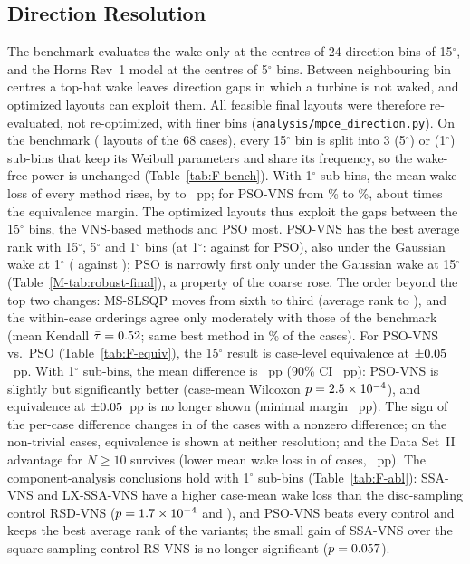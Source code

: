 \documentclass[10pt]{article}
\begin{document}
\subsection{Direction Resolution}
\label{sec:S-direction}
The benchmark evaluates the wake only at the centres of 24 direction bins of 15$^\circ$, and the Horns Rev~1 model at the centres of 5$^\circ$ bins. Between neighbouring bin centres a top-hat wake leaves direction gaps in which a turbine is not waked, and optimized layouts can exploit them. All feasible final layouts were therefore re-evaluated, not re-optimized, with finer bins (\texttt{analysis/mpce\_direction.py}). On the benchmark (\NFNLayouts{} layouts of the 68 cases), every 15$^\circ$ bin is split into 3 (5$^\circ$) or \NFSubBins{} (1$^\circ$) sub-bins that keep its Weibull parameters and share its frequency, so the wake-free power is unchanged (Table~\ref{tab:F-bench}). With 1$^\circ$ sub-bins, the mean wake loss of every method rises, by \NFLossRiseMin{} to \NFLossRiseMax~pp; for PSO-VNS from \NFLossPSOVNSFifteen\% to \NFLossPSOVNSOne\%, about \NFLossRiseMarginRatio{} times the equivalence margin. The optimized layouts thus exploit the gaps between the 15$^\circ$ bins, the VNS-based methods and PSO most. %
 PSO-VNS has the best average rank with 15$^\circ$, 5$^\circ$ and 1$^\circ$ bins (at 1$^\circ$: \NFRankPSOVNSOne{} against \NFRankPSOOne{} for PSO), also under the Gaussian wake at 1$^\circ$ (\NFGaussOneRankPSOVNS{} against \NFGaussOneRankPSO); PSO is narrowly first only under the Gaussian wake at 15$^\circ$ (Table~\ref{M-tab:robust-final}), a property of the coarse rose. The order beyond the top two changes: MS-SLSQP moves from sixth to third (average rank \NFRankMSSLSQPFifteen{} to \NFRankMSSLSQPOne), and the within-case orderings agree only moderately with those of the benchmark (mean Kendall $\bar\tau=0.52$; same best method in \NFSameBestOne\% of the cases). %
 For PSO-VNS vs.\ PSO (Table~\ref{tab:F-equiv}), the 15$^\circ$ result is case-level equivalence at $\pm0.05$~pp. With 1$^\circ$ sub-bins, the mean difference is \NFPairMeanOne~pp (90\% CI \NFPairCIOne~pp): PSO-VNS is slightly but significantly better (case-mean Wilcoxon $p=2.5\times10^{-4}$), and equivalence at $\pm0.05$~pp is no longer shown (minimal margin \NFPairMinMarginOne~pp). The sign of the per-case difference changes in \NFSignChangesOne{} of the \NFSignChangesBase{} cases with a nonzero difference; on the \NFNonTrivN{} non-trivial cases, equivalence is shown at neither resolution; and the Data Set~II advantage for $N\ge10$ survives (lower mean wake loss in \NFDSIINTenWinsOne{} of \NFDSIINTenN{} cases, \NFDSIINTenMeanOne~pp). %
 The component-analysis conclusions hold with 1$^\circ$ sub-bins (Table~\ref{tab:F-abl}): SSA-VNS and LX-SSA-VNS have a higher case-mean wake loss than the disc-sampling control RSD-VNS ($p=1.7\times10^{-4}$ and \NFAblLXSSAVNSvsRSDVNSOneP), and PSO-VNS beats every control and keeps the best average rank of the \NAblNVar{} variants; the small gain of SSA-VNS over the square-sampling control RS-VNS is no longer significant ($p=0.057$). %
\end{document}
